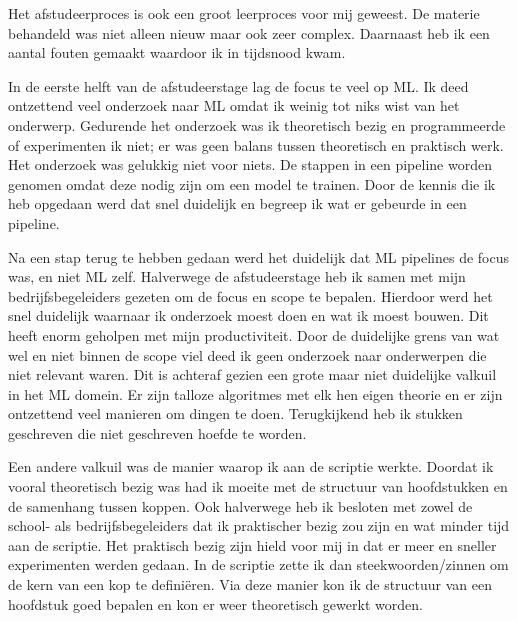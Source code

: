 Het afstudeerproces is ook een groot leerproces voor mij geweest. De materie behandeld was niet alleen nieuw maar ook zeer complex. Daarnaast heb ik een aantal fouten gemaakt waardoor ik in tijdsnood kwam.

In de eerste helft van de afstudeerstage lag de focus te veel op ML. Ik deed ontzettend veel onderzoek naar ML omdat ik weinig tot niks wist van het onderwerp. Gedurende het onderzoek was ik theoretisch bezig en programmeerde of experimenten ik niet; er was geen balans tussen theoretisch en praktisch werk. Het onderzoek was gelukkig niet voor niets. De stappen in een pipeline worden genomen omdat deze nodig zijn om een model te trainen. Door de kennis die ik heb opgedaan werd dat snel duidelijk en begreep ik wat er gebeurde in een pipeline.

Na een stap terug te hebben gedaan werd het duidelijk dat ML pipelines de focus was, en niet ML zelf. Halverwege de afstudeerstage heb ik samen met mijn bedrijfsbegeleiders gezeten om de focus en scope te bepalen. Hierdoor werd het snel duidelijk waarnaar ik onderzoek moest doen en wat ik moest bouwen. Dit heeft enorm geholpen met mijn productiviteit. Door de duidelijke grens van wat wel en niet binnen de scope viel deed ik geen onderzoek naar onderwerpen die niet relevant waren. Dit is achteraf gezien een grote maar niet duidelijke valkuil in het ML domein. Er zijn talloze algoritmes met elk hen eigen theorie en er zijn ontzettend veel manieren om dingen te doen. Terugkijkend heb ik stukken geschreven die niet geschreven hoefde te worden.

Een andere valkuil was de manier waarop ik aan de scriptie werkte. Doordat ik vooral theoretisch bezig was had ik moeite met de structuur van hoofdstukken en de samenhang tussen koppen. Ook halverwege heb ik besloten met zowel de school- als bedrijfsbegeleiders dat ik praktischer bezig zou zijn en wat minder tijd aan de scriptie. Het praktisch bezig zijn hield voor mij in dat er meer en sneller experimenten werden gedaan. In de scriptie zette ik dan steekwoorden/zinnen om de kern van een kop te definiëren. Via deze manier kon ik de structuur van een hoofdstuk goed bepalen en kon er weer theoretisch gewerkt worden.


